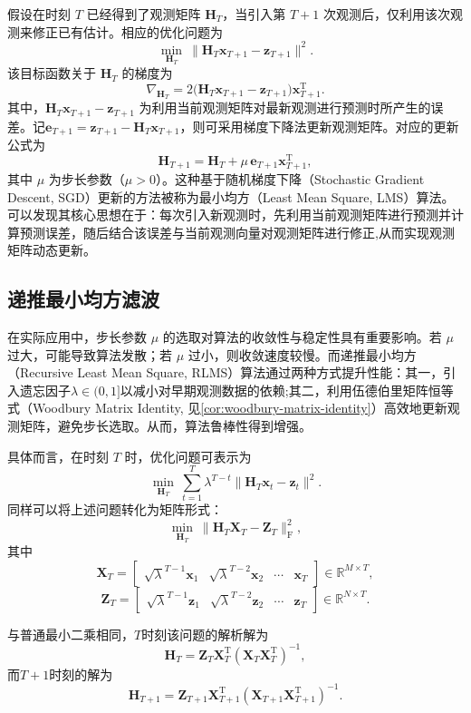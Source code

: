 假设在时刻 \(T\) 已经得到了观测矩阵 \(\mathbf{H}_{T}\)，当引入第 \(T+1\) 次观测后，仅利用该次观测来修正已有估计。相应的优化问题为
\[
    \min_{\mathbf{H}_{T}} \ \big\| \mathbf{H}_{T} \bm{x}_{T+1} - \bm{z}_{T+1} \big\|^2.
\]
该目标函数关于 \(\mathbf{H}_{T}\) 的梯度为
\[
    \nabla_{\mathbf{H}_{T}} = 2\big(\mathbf{H}_{T} \bm{x}_{T+1} - \bm{z}_{T+1}\big)\bm{x}_{T+1}^{\mathrm{T}}.
\]
其中，\(\mathbf{H}_{T}\bm{x}_{T+1}-\bm{z}_{T+1}\) 为利用当前观测矩阵对最新观测进行预测时所产生的误差。记\( \bm{e}_{T+1} = \bm{z}_{T+1} - \mathbf{H}_{T}\bm{x}_{T+1}\)，则可采用梯度下降法更新观测矩阵。对应的更新公式为
\[
    \mathbf{H}_{T+1} = \mathbf{H}_{T} + \mu\, \bm{e}_{T+1}\bm{x}_{T+1}^{\mathrm{T}},
\]
其中 \(\mu\) 为步长参数（\( \mu > 0 \)）。这种基于随机梯度下降（Stochastic Gradient Descent, SGD）更新的方法被称为最小均方（Least Mean Square, LMS）算法。可以发现其核心思想在于：每次引入新观测时，先利用当前观测矩阵进行预测并计算预测误差，随后结合该误差与当前观测向量对观测矩阵进行修正,从而实现观测矩阵动态更新。

\subsection{递推最小均方滤波}

在实际应用中，步长参数 \(\mu\) 的选取对算法的收敛性与稳定性具有重要影响。若 \(\mu\) 过大，可能导致算法发散；若 \(\mu\) 过小，则收敛速度较慢。而递推最小均方（Recursive Least Mean Square, RLMS）算法通过两种方式提升性能：其一，引入遗忘因子\( \lambda \in (0,1] \)以减小对早期观测数据的依赖;其二，利用伍德伯里矩阵恒等式（Woodbury Matrix Identity, 见\cref{cor:woodbury-matrix-identity}）高效地更新观测矩阵，避免步长选取。从而，算法鲁棒性得到增强。

具体而言，在时刻 \( T \) 时，优化问题可表示为
\[
    \min_{\mathbf{H}_T} \ \sum_{t=1}^{T} \lambda^{T-t} \big\| \mathbf{H}_T\bm{x}_t - \bm{z}_t \big\|^2.
\]
同样可以将上述问题转化为矩阵形式：
\[
    \min_{\mathbf{H}_T} \ \big\| \mathbf{H}_T \mathbf{X}_T - \mathbf{Z}_T\big\|_{\mathrm{F}}^2,
\]
其中
\[
    \mathbf{X}_T = \begin{bmatrix} \sqrt{\lambda}^{T-1}\bm{x}_1 & \sqrt{\lambda}^{T-2}\bm{x}_2 & \cdots & \bm{x}_T \end{bmatrix} \in \mathbb{R}^{M \times T},
\]
\[
    \mathbf{Z}_T = \begin{bmatrix} \sqrt{\lambda}^{T-1}\bm{z}_1 & \sqrt{\lambda}^{T-2}\bm{z}_2 & \cdots & \bm{z}_T \end{bmatrix} \in \mathbb{R}^{N \times T}.
\]

与普通最小二乘相同，\( T \)时刻该问题的解析解为
\[
    \mathbf{H}_T = \mathbf{Z}_T \mathbf{X}_T^{\mathrm{T}} \left( \mathbf{X}_T \mathbf{X}_T ^{\mathrm{T}} \right)^{-1},
\]
而\( T + 1 \)时刻的解为
\[
    \mathbf{H}_{T+1} = \mathbf{Z}_{T+1} \mathbf{X}_{T+1}^{\mathrm{T}} \left( \mathbf{X}_{T+1} \mathbf{X}_{T+1} ^{\mathrm{T}} \right)^{-1}.
\]

